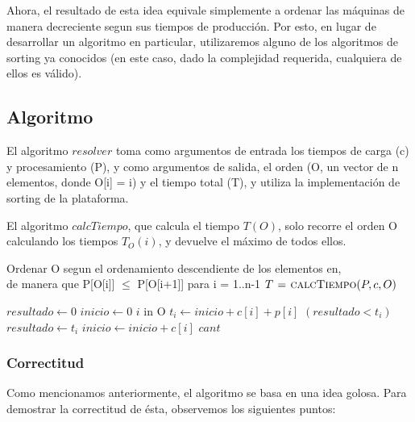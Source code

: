 Ahora, el resultado de esta idea equivale simplemente a ordenar las m\'aquinas de manera decreciente segun sus tiempos de producci\'on. Por esto, en lugar de desarrollar un algoritmo en particular, utilizaremos alguno de los algoritmos de sorting ya conocidos (en este caso, dado la complejidad requerida, cualquiera de ellos es v\'alido).

\subsection{Algoritmo}
 
El algoritmo $resolver$ toma como argumentos de entrada los tiempos de carga (c) y procesamiento (P), y como argumentos de salida,
el orden (O, un vector de n elementos, donde O[i] = i) y el tiempo total (T), y utiliza la implementaci\'on
de sorting de la plataforma. 

El algoritmo $calcTiempo$, que calcula el tiempo $T(O)$, solo recorre el orden O
calculando los tiempos $T_{O}(i)$, y devuelve el m\'aximo de todos ellos. 


\begin{algorithm}[H]
\caption{}
\begin{codebox}
\li Ordenar O segun el ordenamiento descendiente de los elementos en, \\
 			de manera que P[O[i]] $\leq$ P[O[i+1]] para i = 1..n-1
\li $T  \mathrel{\hspace{1pt}=\hspace{1pt}} \textnormal{\scshape calcTiempo}(P, c, O)$
\End
\end{codebox}
\end{algorithm}

\begin{algorithm}[H]
\caption{} 
\begin{codebox}
\li $resultado \gets 0$
\li $inicio \gets 0$
\li \For $i$ in O\Do
\li   $t_i \gets inicio + c[i] + p[i]$ 	
\li  	\If $(resultado < t_i)$ \Do
\li 		$resultado \gets t_i$		
 		\End
\li		$inicio \gets inicio  + c[i]$ 		
 	\End	
\li \Return $cant $
\End
\end{codebox}
\end{algorithm}

\subsubsection{Correctitud} 

Como mencionamos anteriormente, el algoritmo se basa en una idea golosa. Para demostrar la correctitud de \'esta, observemos los siguientes puntos:
 
